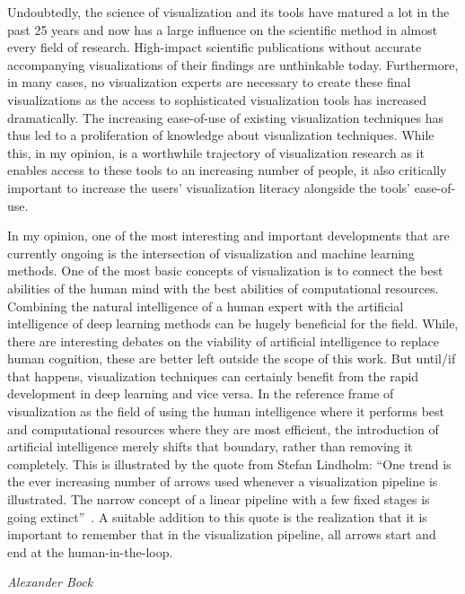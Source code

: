 Undoubtedly, the science of visualization and its tools have matured a lot in the past 25 years and now has a large influence on the scientific method in almost every field of research.  High-impact scientific publications without accurate accompanying visualizations of their findings are unthinkable today.  Furthermore, in many cases, no visualization experts are necessary to create these final visualizations as the access to sophisticated visualization tools has increased dramatically.  The increasing ease-of-use of existing visualization techniques has thus led to a proliferation of knowledge about visualization techniques.  While this, in my opinion, is a worthwhile trajectory of visualization research as it enables access to these tools to an increasing number of people, it also critically important to increase the users' visualization literacy alongside the tools' ease-of-use.

In my opinion, one of the most interesting and important developments that are currently ongoing is the intersection of visualization and machine learning methods.  One of the most basic concepts of visualization is to connect the best abilities of the human mind with the best abilities of computational resources.  Combining the natural intelligence of a human expert with the artificial intelligence of deep learning methods can be hugely beneficial for the field.  While, there are interesting debates on the viability of artificial intelligence to replace human cognition, these are better left outside the scope of this work.  But until/if that happens, visualization techniques can certainly benefit from the rapid development in deep learning and vice versa.  In the reference frame of visualization as the field of using the human intelligence where it performs best and computational resources where they are most efficient, the introduction of artificial intelligence merely shifts that boundary, rather than removing it completely.  This is illustrated by the quote from Stefan Lindholm: ``One trend is the ever increasing number of arrows used whenever a visualization pipeline is illustrated. The narrow concept of a linear pipeline with a few fixed stages is going extinct''~\cite{lindholm14medical}.  A suitable addition to this quote is the realization that it is important to remember that in the visualization pipeline, all arrows start and end at the human-in-the-loop.

\vfill \hfill \emph{Alexander Bock}